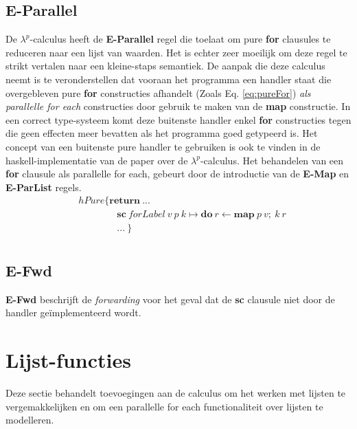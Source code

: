 \subsection{E-Parallel}
De $\lambda^p$-calculus heeft de \textbf{E-Parallel} regel die toelaat om pure \textbf{for} clausules te reduceren naar een lijst van waarden. Het is echter zeer moeilijk om deze regel te strikt vertalen naar een kleine-staps semantiek. De aanpak die deze calculus neemt is te veronderstellen dat vooraan het programma een handler staat die overgebleven pure \textbf{for} constructies afhandelt (Zoals Eq. \ref{eq:pureFor}) \emph{als parallelle for each} constructies door gebruik te maken van de \textbf{map} constructie. In een correct type-systeem komt deze buitenste handler enkel \textbf{for} constructies tegen die geen effecten meer bevatten als het programma goed getypeerd is. Het concept van een buitenste pure handler te gebruiken is ook te vinden in de haskell-implementatie van de paper\cite{Xie2021} over de $\lambda^p$-calculus. Het behandelen van een \textbf{for} clausule als parallelle for each, gebeurt door de introductie van de \textbf{E-Map} en \textbf{E-ParList} regels.
\begin{equation}
\label{eq:pureFor}
    \begin{split}
        & hPure \{ \textbf{return} \ ... \\
        & \qquad \qquad \textbf{sc} \ forLabel \ v \ p \ k \mapsto \textbf{do} \ r \leftarrow \textbf{map} \ p \ v; \ k \ r \\
        & \qquad \qquad ... \ \} \\
    \end{split}
\end{equation}

\subsection{E-Fwd} \label{sec:fwdsc}
\textbf{E-Fwd} beschrijft de \emph{forwarding} voor het geval dat de \textbf{sc} clausule niet door de handler geïmplementeerd wordt. 

\section{Lijst-functies}
Deze sectie behandelt toevoegingen aan de calculus om het werken met lijsten te vergemakkelijken en om een parallelle for each functionaliteit over lijsten te modelleren. 


